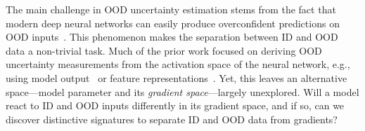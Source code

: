\documentclass{article}
\begin{document}
The main challenge in OOD uncertainty estimation stems from the fact that modern deep neural networks can easily produce overconfident predictions on OOD inputs~\cite{nguyen2015deep}. This phenomenon makes the separation between ID and OOD data a non-trivial task. Much of the prior work focused on deriving OOD uncertainty measurements from the activation space of the neural network, e.g., using model output~\cite{hendrycks2016baseline, hsu2020generalized,lakshminarayanan2017simple,liang2018enhancing, liu2020energy} or feature representations~\cite{lee2018simple}. Yet, this leaves an alternative space---model {parameter and its \emph{gradient space}}---largely unexplored. %
Will a model react to ID and OOD inputs differently in its gradient space, and if so, can we discover distinctive signatures to separate ID and OOD data from gradients?

\end{document}
